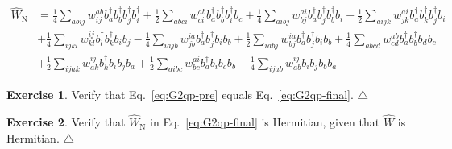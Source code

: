 \documentclass{report}
\theoremstyle{plain}
\theoremstyle{definition}
\newtheorem{exerc}{Exercise}[chapter]
\newcommand\xqed[1]{%
  \leavevmode\unskip\penalty9999 \hbox{}\nobreak\hfill
  \quad\hbox{#1}}
\newcommand\demo{\xqed{$\triangle$}}
\newenvironment{exercise}{\bigskip\begin{exerc}}{\demo\end{exerc}\bigskip}
\begin{document}
\begin{equation}
  \begin{split}
  \hat{W}_\text{N}
& = 
\frac{1}{4}\sum_{abij}w^{ab}_{ij}  b^\dag_a b^\dag_b b^\dag_j b^\dag_i
+ \frac{1}{2}\sum_{abci} w^{ab}_{ci} b^\dag_a b^\dag_b b^\dag_i b_c 
+ \frac{1}{4}\sum_{aibj}w^{ai}_{bj} b^\dag_a b^\dag_j b^\dag_b b_i  
  + \frac{1}{2}\sum_{aijk} w^{ai}_{jk} b^\dag_a  b^\dag_k b^\dag_j b_i  \\
& + \frac{1}{4}\sum_{ijkl} w^{ij}_{kl}
  b^\dag_lb^\dag_kb_ib_j 
  - \frac{1}{4}\sum_{iajb} w^{ia}_{jb} b^\dag_a b^\dag_j b_i b_b
  + \frac{1}{2}\sum_{iabj} w^{ia}_{bj} b^\dag_a b^\dag_j b_i b_b 
  + \frac{1}{4}\sum_{abcd} w^{ab}_{cd} b^\dag_a b^\dag_b b_d b_c
\\
& +\frac{1}{2}\sum_{ijak} w^{ij}_{ak} b^\dag_k b_i b_j  b_a
   +\frac{1}{2}\sum_{aibc} w^{ai}_{bc}  b^\dag_a b_i b_c b_b 
   + \frac{1}{4}\sum_{ijab} w^{ij}_{ab} b_i b_j b_b b_a  \label{eq:G2qp-final}
\end{split} 
\end{equation}

\begin{exercise}
  Verify that Eq.~\eqref{eq:G2qp-pre} equals Eq.~\eqref{eq:G2qp-final}.
\end{exercise}
\begin{exercise}
  Verify that $\hat{W}_\text{N}$ in Eq.~\eqref{eq:G2qp-final} is Hermitian, given that $\hat{W}$ is
  Hermitian. 
\end{exercise}
\end{document}
